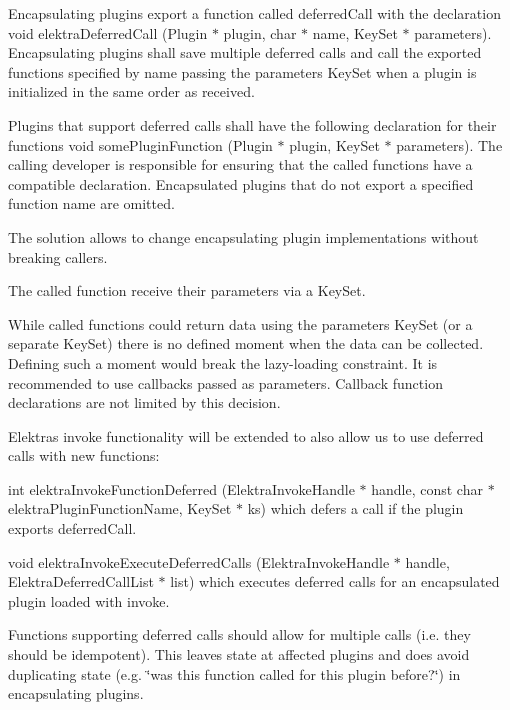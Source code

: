 Encapsulating plugins export a function called {\ttfamily deferred\+Call} with the declaration {\ttfamily void elektra\+Deferred\+Call (Plugin $\ast$ plugin, char $\ast$ name, Key\+Set $\ast$ parameters)}. Encapsulating plugins shall save multiple deferred calls and call the exported functions specified by {\ttfamily name} passing the {\ttfamily parameters} Key\+Set when a plugin is initialized in the same order as received.

Plugins that support deferred calls shall have the following declaration for their functions {\ttfamily void some\+Plugin\+Function (Plugin $\ast$ plugin, Key\+Set $\ast$ parameters)}. The calling developer is responsible for ensuring that the called functions have a compatible declaration. Encapsulated plugins that do not export a specified function name are omitted.

The solution allows to change encapsulating plugin implementations without breaking callers.

The called function receive their parameters via a Key\+Set.

While called functions could return data using the {\ttfamily parameters} Key\+Set (or a separate Key\+Set) there is no defined moment when the data can be collected. Defining such a moment would break the lazy-\/loading constraint. It is recommended to use callbacks passed as {\ttfamily parameters}. Callback function declarations are not limited by this decision.


\begin{DoxyItemize}
\item Elektra\textquotesingle{}s invoke functionality will be extended to also allow us to use deferred calls with new functions\+:
\item {\ttfamily int elektra\+Invoke\+Function\+Deferred (Elektra\+Invoke\+Handle $\ast$ handle, const char $\ast$ elektra\+Plugin\+Function\+Name, Key\+Set $\ast$ ks)} which defers a call if the plugin exports {\ttfamily deferred\+Call}.
\item {\ttfamily void elektra\+Invoke\+Execute\+Deferred\+Calls (Elektra\+Invoke\+Handle $\ast$ handle, Elektra\+Deferred\+Call\+List $\ast$ list)} which executes deferred calls for an encapsulated plugin loaded with invoke.
\item Functions supporting deferred calls should allow for multiple calls (i.\+e. they should be idempotent). This leaves state at affected plugins and does avoid duplicating state (e.\+g. \char`\"{}was this function called for this plugin before?\char`\"{}) in encapsulating plugins.
\end{DoxyItemize}

